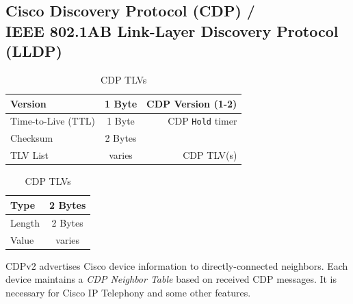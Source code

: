 \documentclass[12pt]{article}
\begin{document}
	\subsection[Cisco CDP / IEEE 802.1AB LLDP]{Cisco Discovery Protocol (CDP) /\\IEEE 802.1AB Link-Layer Discovery Protocol (LLDP) \label{subsec:CDP/802.1AB}}
	\begin{table}[H]
	\begin{minipage}{.6\linewidth}
	\centering
	\caption{CDP Frame Format \label{tab:CDP}}
	\begin{tabular}{| l | c | r |}\hline
	Version			& 1 Byte	& CDP Version (1-2)\\\hline
	Time-to-Live (TTL)	& 1 Byte	& CDP \texttt{Hold} timer\\\hline
	Checksum			& 2 Bytes	&\\\hline
	TLV List 			& varies	& CDP TLV(s)\\\hline
	\end{tabular}\end{minipage}\hfill
	\begin{minipage}{.3\linewidth}
	\centering
	\caption{CDP TLVs \label{tab:CDP TLV}}
	\begin{tabular}{| l | c |}\hline
	Type		& 2 Bytes\\\hline
	Length	& 2 Bytes\\\hline
	Value		& varies\\\hline
	\end{tabular}\end{minipage}\end{table}
	CDPv2 advertises Cisco device information to directly-connected neighbors. Each device maintains a \textit{CDP Neighbor Table} based on received CDP messages. It is necessary for Cisco IP Telephony and some other features.
\end{document}
